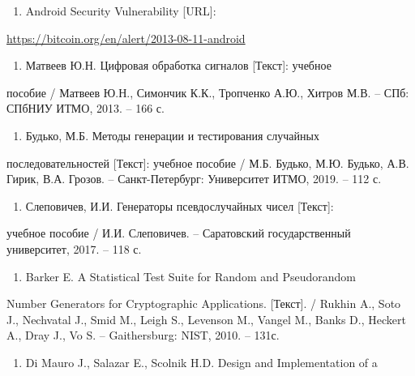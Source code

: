 \clearpage
{}

\begin{enumerate}
\def\labelenumi{\arabic{enumi}}
\item
  Android Security Vulnerability {[}URL{]}:
\end{enumerate}

\url{https://bitcoin.org/en/alert/2013-08-11-android}

\begin{enumerate}
\def\labelenumi{\arabic{enumi}}
\setcounter{enumi}{1}
\item
  Матвеев Ю.Н. Цифровая обработка сигналов {[}Текст{]}: учебное
\end{enumerate}

пособие / Матвеев Ю.Н., Симончик К.К., Тропченко А.Ю., Хитров М.В. --
СПб: СПбНИУ ИТМО, 2013. -- 166 с.

\begin{enumerate}
\def\labelenumi{\arabic{enumi}}
\setcounter{enumi}{2}
\item
  Будько, М.Б. Методы генерации и тестирования случайных
\end{enumerate}

последовательностей {[}Текст{]}: учебное пособие / М.Б. Будько, М.Ю.
Будько, А.В. Гирик, В.А. Грозов. -- Санкт-Петербург: Университет ИТМО,
2019. -- 112 с.

\begin{enumerate}
\def\labelenumi{\arabic{enumi}}
\setcounter{enumi}{3}
\item
  Слеповичев, И.И. Генераторы псевдослучайных чисел {[}Текст{]}:
\end{enumerate}

учебное пособие / И.И. Слеповичев. -- Саратовский государственный
университет, 2017. -- 118 с.

\begin{enumerate}
\def\labelenumi{\arabic{enumi}}
\setcounter{enumi}{4}
\item
  Barker E. A Statistical Test Suite for Random and Pseudorandom
\end{enumerate}

Number Generators for Cryptographic Applications. {[}Текст{]}. / Rukhin
A., Soto J., Nechvatal J., Smid M., Leigh S., Levenson M., Vangel M.,
Banks D., Heckert A., Dray J., Vo S. -- Gaithersburg: NIST, 2010. --
131с.

\begin{enumerate}
\def\labelenumi{\arabic{enumi}}
\setcounter{enumi}{5}
\item
  Di Mauro J., Salazar E., Scolnik H.D. Design and Implementation of a
\end{enumerate}

